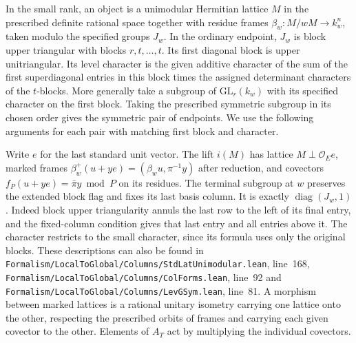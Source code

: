 \documentclass[a4paper,11pt]{article}
\theoremstyle{definition}
\theoremstyle{remark}
\newcommand{\srcloc}[2]{{\small\nolinkurl{#1.lean}}, line~#2}
\numberwithin{equation}{section}
\begin{document}
In the small rank, an object is a unimodular Hermitian lattice
\(M\) in the prescribed definite rational space together with
residue frames \(\beta_w:M/wM\longrightarrow k_w^n\), taken
modulo the specified groups \(J_w\). In the ordinary endpoint,
\(J_w\) is block upper triangular with blocks \(r,t,\ldots,t\).
Its first diagonal block is upper unitriangular. Its level
character is the given additive character of the sum of the first
superdiagonal entries in this block times the assigned determinant
characters of the \(t\)-blocks. More generally take a subgroup
of \(\mathrm{GL}_r(k_w)\) with its specified character on the
first block. Taking the prescribed symmetric subgroup in its chosen
order gives the symmetric pair of endpoints. We use the following
arguments for each pair with matching first block and character.

Write \(e\) for the last standard unit vector. The lift \(i(M)\)
has lattice \(M\perp\mathcal O_Ee\), marked frames
\(\beta_w^+(u+ye)=(\beta_w u,\pi^{-1}y)\) after reduction, and
covectors \(f_P(u+ye)=\bar\pi y\bmod P\) on its residues.
The terminal subgroup at \(w\) preserves the extended block flag
and fixes its last basis column. It is exactly
\(\operatorname{diag}(J_w,1)\). Indeed block upper triangularity
annuls the last row to the left of its final entry, and the
fixed-column condition gives that last entry and all entries above
it. The character restricts to the small character, since its
formula uses only the original blocks. These descriptions can
also be found in \srcloc{Formalism/LocalToGlobal/Columns/StdLatUnimodular}{168},
\srcloc{Formalism/LocalToGlobal/Columns/ColForms}{92} and
\srcloc{Formalism/LocalToGlobal/Columns/LevGSym}{81}.
A morphism between marked lattices is a rational unitary isometry
carrying one lattice onto the other, respecting the prescribed
orbits of frames and carrying each given covector to the other.
Elements of \(A_T\) act by multiplying the individual covectors.
\end{document}
